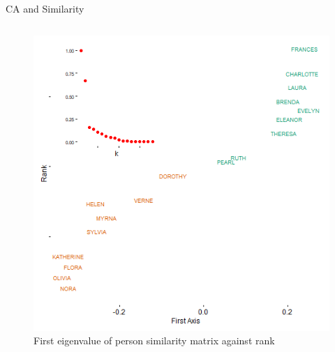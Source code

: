\documentclass[
  ignorenonframetext,
]{beamer}
\begin{document}
\begin{frame}{CA and Similarity}
\begin{columns}[T]
\begin{column}{0.5\textwidth}
\begin{figure}
{\centering \includegraphics{Plots/ca-eigvec-p.png}

}

\caption{First eigenvalue of person similarity matrix against rank}

\end{figure}
\end{column}
\end{columns}
\end{frame}
\end{document}
